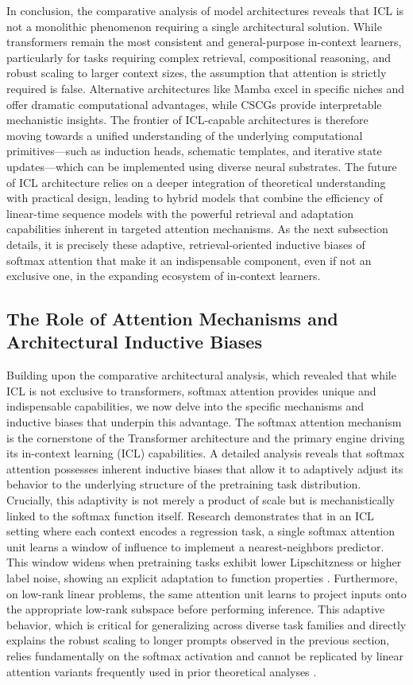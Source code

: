\documentclass[11pt]{article}
\begin{document}
In conclusion, the comparative analysis of model architectures reveals that ICL is not a monolithic phenomenon requiring a single architectural solution. While transformers remain the most consistent and general-purpose in-context learners, particularly for tasks requiring complex retrieval, compositional reasoning, and robust scaling to larger context sizes, the assumption that attention is strictly required is false. Alternative architectures like Mamba excel in specific niches and offer dramatic computational advantages, while CSCGs provide interpretable mechanistic insights. The frontier of ICL-capable architectures is therefore moving towards a unified understanding of the underlying computational primitives---such as induction heads, schematic templates, and iterative state updates---which can be implemented using diverse neural substrates. The future of ICL architecture relies on a deeper integration of theoretical understanding with practical design, leading to hybrid models that combine the efficiency of linear-time sequence models with the powerful retrieval and adaptation capabilities inherent in targeted attention mechanisms. As the next subsection details, it is precisely these adaptive, retrieval-oriented inductive biases of softmax attention that make it an indispensable component, even if not an exclusive one, in the expanding ecosystem of in-context learners.

\subsection{The Role of Attention Mechanisms and Architectural Inductive Biases}

Building upon the comparative architectural analysis, which revealed that while ICL is not exclusive to transformers, softmax attention provides unique and indispensable capabilities, we now delve into the specific mechanisms and inductive biases that underpin this advantage. The softmax attention mechanism is the cornerstone of the Transformer architecture and the primary engine driving its in-context learning (ICL) capabilities. A detailed analysis reveals that softmax attention possesses inherent inductive biases that allow it to adaptively adjust its behavior to the underlying structure of the pretraining task distribution. Crucially, this adaptivity is not merely a product of scale but is mechanistically linked to the softmax function itself. Research demonstrates that in an ICL setting where each context encodes a regression task, a single softmax attention unit learns a window of influence to implement a nearest-neighbors predictor. This window widens when pretraining tasks exhibit lower Lipschitzness or higher label noise, showing an explicit adaptation to function properties \cite{ref65}. Furthermore, on low-rank linear problems, the same attention unit learns to project inputs onto the appropriate low-rank subspace before performing inference. This adaptive behavior, which is critical for generalizing across diverse task families and directly explains the robust scaling to longer prompts observed in the previous section, relies fundamentally on the softmax activation and cannot be replicated by linear attention variants frequently used in prior theoretical analyses \cite{ref65,ref90}.
\end{document}
